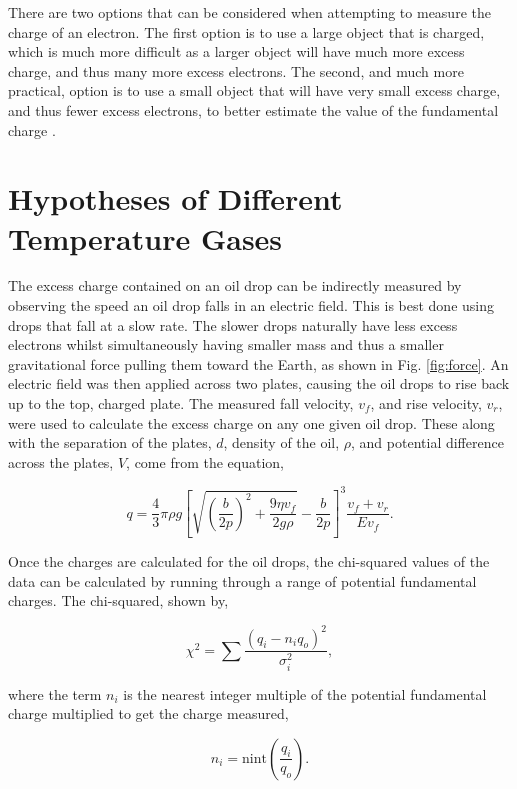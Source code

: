 \documentclass[%
 reprint,
 amsmath,amssymb,
 aps,
]{revtex4-2}
\begin{document}
There are two options that can be considered when attempting to measure the charge of an electron. The first option is to use a large object that is charged, which is much more difficult as a larger object will have much more excess charge, and thus many more excess electrons. The second, and much more practical, option is to use a small object that will have very small excess charge, and thus fewer excess electrons, to better estimate the value of the fundamental charge \cite{manual}.

\section{Hypotheses of Different Temperature Gases}
The excess charge contained on an oil drop can be indirectly measured by observing the speed an oil drop falls in an electric field. This is best done using drops that fall at a slow rate. The slower drops naturally have less excess electrons whilst simultaneously having smaller mass and thus a smaller gravitational force pulling them toward the Earth, as shown in Fig. \ref{fig:force}. An electric field was then applied across two plates, causing the oil drops to rise back up to the top, charged plate. The measured fall velocity, $v_f$, and rise velocity, $v_r$, were used to calculate the excess charge on any one given oil drop. These along with the separation of the plates, $d$, density of the oil, $\rho$, and potential difference across the plates, $V$, come from the equation,

\begin{equation}
q=\frac{4}{3}\pi \rho g\left [  \sqrt{\left (\frac{b}{2p}\right )^2+\frac{9 \eta v_f}{2g\rho}}-\frac{b}{2p}\right ]^3\frac{v_f + v_r}{Ev_f}.
\label{eq:big}
\end{equation}

Once the charges are calculated for the oil drops, the chi-squared values of the data can be calculated by running through a range of potential fundamental charges. The chi-squared, shown by,

\begin{equation}
\chi^2=\sum\frac{\left (  q_i-n_iq_o\right )^2}{\sigma_i^2},
\end{equation}

where the term $n_i$ is the nearest integer multiple of the potential fundamental charge multiplied to get the charge measured,

\begin{equation}
n_i=\mathrm{nint}(\frac{q_i}{q_o}).
\end{equation}
\end{document}
